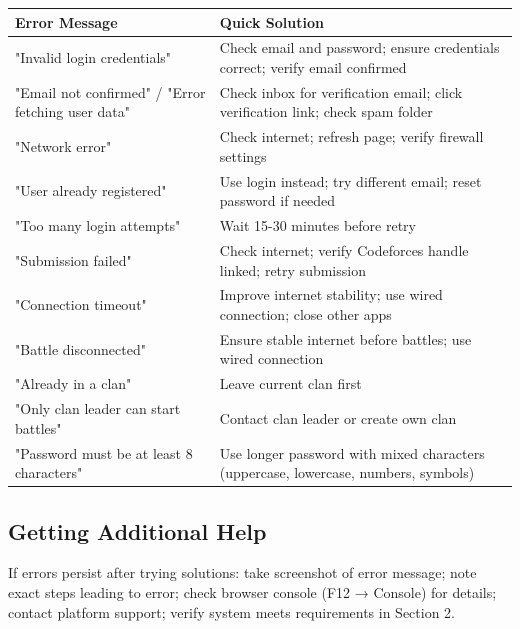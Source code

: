 \documentclass[12pt,a4paper]{article}
\begin{document}
\begin{longtable}{|p{6cm}|p{8cm}|}
\hline
\textbf{Error Message} & \textbf{Quick Solution} \\
\hline
\endhead

"Invalid login credentials" & Check email and password; ensure credentials correct; verify email confirmed \\
\hline

"Email not confirmed" / "Error fetching user data" & Check inbox for verification email; click verification link; check spam folder \\
\hline

"Network error" & Check internet; refresh page; verify firewall settings \\
\hline

"User already registered" & Use login instead; try different email; reset password if needed \\
\hline

"Too many login attempts" & Wait 15-30 minutes before retry \\
\hline

"Submission failed" & Check internet; verify Codeforces handle linked; retry submission \\
\hline

"Connection timeout" & Improve internet stability; use wired connection; close other apps \\
\hline

"Battle disconnected" & Ensure stable internet before battles; use wired connection \\
\hline

"Already in a clan" & Leave current clan first \\
\hline

"Only clan leader can start battles" & Contact clan leader or create own clan \\
\hline

"Password must be at least 8 characters" & Use longer password with mixed characters (uppercase, lowercase, numbers, symbols) \\
\hline

\end{longtable}

\subsection{Getting Additional Help}

If errors persist after trying solutions: take screenshot of error message; note exact steps leading to error; check browser console (F12 → Console) for details; contact platform support; verify system meets requirements in Section 2.

\FloatBarrier

\end{document}
